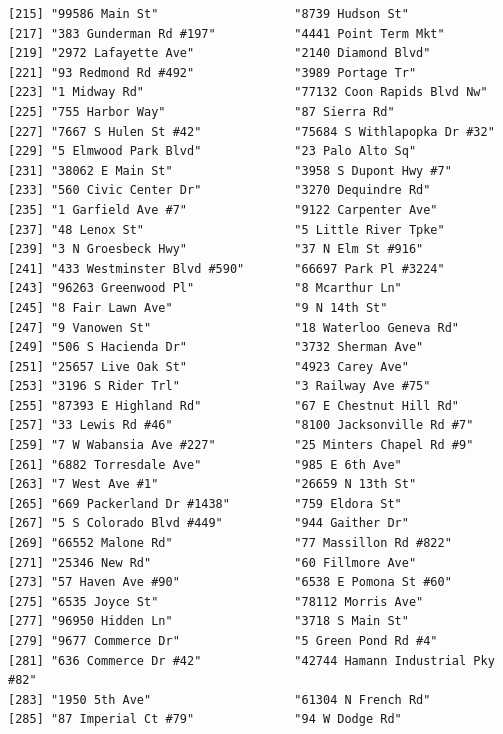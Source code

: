 \documentclass[
  12pt,
]{article}
\begin{document}
\begin{verbatim}
[215] "99586 Main St"                   "8739 Hudson St"                 
[217] "383 Gunderman Rd #197"           "4441 Point Term Mkt"            
[219] "2972 Lafayette Ave"              "2140 Diamond Blvd"              
[221] "93 Redmond Rd #492"              "3989 Portage Tr"                
[223] "1 Midway Rd"                     "77132 Coon Rapids Blvd Nw"      
[225] "755 Harbor Way"                  "87 Sierra Rd"                   
[227] "7667 S Hulen St #42"             "75684 S Withlapopka Dr #32"     
[229] "5 Elmwood Park Blvd"             "23 Palo Alto Sq"                
[231] "38062 E Main St"                 "3958 S Dupont Hwy #7"           
[233] "560 Civic Center Dr"             "3270 Dequindre Rd"              
[235] "1 Garfield Ave #7"               "9122 Carpenter Ave"             
[237] "48 Lenox St"                     "5 Little River Tpke"            
[239] "3 N Groesbeck Hwy"               "37 N Elm St #916"               
[241] "433 Westminster Blvd #590"       "66697 Park Pl #3224"            
[243] "96263 Greenwood Pl"              "8 Mcarthur Ln"                  
[245] "8 Fair Lawn Ave"                 "9 N 14th St"                    
[247] "9 Vanowen St"                    "18 Waterloo Geneva Rd"          
[249] "506 S Hacienda Dr"               "3732 Sherman Ave"               
[251] "25657 Live Oak St"               "4923 Carey Ave"                 
[253] "3196 S Rider Trl"                "3 Railway Ave #75"              
[255] "87393 E Highland Rd"             "67 E Chestnut Hill Rd"          
[257] "33 Lewis Rd #46"                 "8100 Jacksonville Rd #7"        
[259] "7 W Wabansia Ave #227"           "25 Minters Chapel Rd #9"        
[261] "6882 Torresdale Ave"             "985 E 6th Ave"                  
[263] "7 West Ave #1"                   "26659 N 13th St"                
[265] "669 Packerland Dr #1438"         "759 Eldora St"                  
[267] "5 S Colorado Blvd #449"          "944 Gaither Dr"                 
[269] "66552 Malone Rd"                 "77 Massillon Rd #822"           
[271] "25346 New Rd"                    "60 Fillmore Ave"                
[273] "57 Haven Ave #90"                "6538 E Pomona St #60"           
[275] "6535 Joyce St"                   "78112 Morris Ave"               
[277] "96950 Hidden Ln"                 "3718 S Main St"                 
[279] "9677 Commerce Dr"                "5 Green Pond Rd #4"             
[281] "636 Commerce Dr #42"             "42744 Hamann Industrial Pky #82"
[283] "1950 5th Ave"                    "61304 N French Rd"              
[285] "87 Imperial Ct #79"              "94 W Dodge Rd"                  

\end{verbatim}
\end{document}
